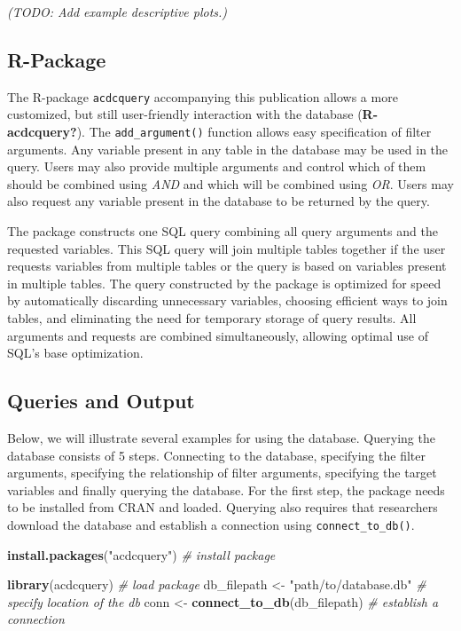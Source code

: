 \documentclass[
  man,floatsintext]{apa6}
\newenvironment{Shaded}{\begin{snugshade}}{\end{snugshade}}
\newcommand{\CommentTok}[1]{\textcolor[rgb]{0.56,0.35,0.01}{\textit{#1}}}
\newcommand{\FunctionTok}[1]{\textcolor[rgb]{0.13,0.29,0.53}{\textbf{#1}}}
\newcommand{\NormalTok}[1]{#1}
\newcommand{\OtherTok}[1]{\textcolor[rgb]{0.56,0.35,0.01}{#1}}
\newcommand{\StringTok}[1]{\textcolor[rgb]{0.31,0.60,0.02}{#1}}
\begin{document}
\emph{ (TODO: Add example descriptive plots.)}

\hypertarget{r-package}{%
\subsection{R-Package}\label{r-package}}

The R-package \texttt{acdcquery} accompanying this publication allows a more customized, but still user-friendly interaction with the database (\textbf{R-acdcquery?}). The \texttt{add\_argument()} function allows easy specification of filter arguments. Any variable present in any table in the database may be used in the query. Users may also provide multiple arguments and control which of them should be combined using \emph{AND} and which will be combined using \emph{OR}. Users may also request any variable present in the database to be returned by the query.

The package constructs one SQL query combining all query arguments and the requested variables. This SQL query will join multiple tables together if the user requests variables from multiple tables or the query is based on variables present in multiple tables. The query constructed by the package is optimized for speed by automatically discarding unnecessary variables, choosing efficient ways to join tables, and eliminating the need for temporary storage of query results. All arguments and requests are combined simultaneously, allowing optimal use of SQL's base optimization.

\hypertarget{queries-and-output}{%
\subsection{Queries and Output}\label{queries-and-output}}

Below, we will illustrate several examples for using the database. Querying the database consists of 5 steps. Connecting to the database, specifying the filter arguments, specifying the relationship of filter arguments, specifying the target variables and finally querying the database. For the first step, the package needs to be installed from CRAN and loaded. Querying also requires that researchers download the database and establish a connection using \texttt{connect\_to\_db()}.

\begin{Shaded}
\begin{Highlighting}[]
\FunctionTok{install.packages}\NormalTok{(}\StringTok{"acdcquery"}\NormalTok{) }\CommentTok{\# install package}

\FunctionTok{library}\NormalTok{(acdcquery) }\CommentTok{\# load package}
\NormalTok{db\_filepath }\OtherTok{\textless{}{-}} \StringTok{"path/to/database.db"} \CommentTok{\# specify location of the db}
\NormalTok{conn }\OtherTok{\textless{}{-}} \FunctionTok{connect\_to\_db}\NormalTok{(db\_filepath) }\CommentTok{\# establish a connection}
\end{Highlighting}
\end{Shaded}
\end{document}
